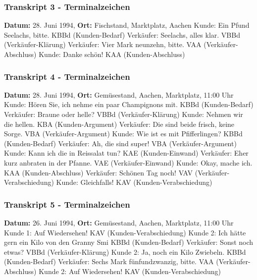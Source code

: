 \documentclass[
]{article}
\begin{document}
\subsubsection{\texorpdfstring{\textbf{Transkript 3 -
Terminalzeichen}}{Transkript 3 - Terminalzeichen}}\label{transkript-3---terminalzeichen-1}

\textbf{Datum:} 28. Juni 1994, \textbf{Ort:} Fischstand, Marktplatz,
Aachen\textbar{} Kunde: Ein Pfund Seelachs, bitte. \textbar{} KBBd
(Kunden-Bedarf) \textbar{} Verkäufer: Seelachs, alles klar. \textbar{}
VBBd (Verkäufer-Klärung) \textbar{} Verkäufer: Vier Mark neunzehn,
bitte. \textbar{} VAA (Verkäufer-Abschluss) \textbar{} Kunde: Danke
schön! \textbar{} KAA (Kunden-Abschluss)

\subsubsection{\texorpdfstring{\textbf{Transkript 4 -
Terminalzeichen}}{Transkript 4 - Terminalzeichen}}\label{transkript-4---terminalzeichen-1}

\textbf{Datum:} 28. Juni 1994, \textbf{Ort:} Gemüsestand, Aachen,
Marktplatz, 11:00 Uhr\textbar{} Kunde: Hören Sie, ich nehme ein paar
Champignons mit. \textbar{} KBBd (Kunden-Bedarf) \textbar{} Verkäufer:
Braune oder helle? \textbar{} VBBd (Verkäufer-Klärung) \textbar{} Kunde:
Nehmen wir die hellen. \textbar{} KBA (Kunden-Argument) \textbar{}
Verkäufer: Die sind beide frisch, keine Sorge. \textbar{} VBA
(Verkäufer-Argument) \textbar{} Kunde: Wie ist es mit Pfifferlingen?
\textbar{} KBBd (Kunden-Bedarf) \textbar{} Verkäufer: Ah, die sind
super! \textbar{} VBA (Verkäufer-Argument) \textbar{} Kunde: Kann ich
die in Reissalat tun? \textbar{} KAE (Kunden-Einwand) \textbar{}
Verkäufer: Eher kurz anbraten in der Pfanne. \textbar{} VAE
(Verkäufer-Einwand) \textbar{} Kunde: Okay, mache ich. \textbar{} KAA
(Kunden-Abschluss) \textbar{} Verkäufer: Schönen Tag noch! \textbar{}
VAV (Verkäufer-Verabschiedung) \textbar{} Kunde: Gleichfalls! \textbar{}
KAV (Kunden-Verabschiedung)

\subsubsection{\texorpdfstring{\textbf{Transkript 5 -
Terminalzeichen}}{Transkript 5 - Terminalzeichen}}\label{transkript-5---terminalzeichen-1}

\textbf{Datum:} 26. Juni 1994, \textbf{Ort:} Gemüsestand, Aachen,
Marktplatz, 11:00 Uhr\textbar{} Kunde 1: Auf Wiedersehen! \textbar{} KAV
(Kunden-Verabschiedung) \textbar{} Kunde 2: Ich hätte gern ein Kilo von
den Granny Smi\textbar{} KBBd (Kunden-Bedarf) \textbar{} Verkäufer:
Sonst noch etwas? \textbar{} VBBd (Verkäufer-Klärung) \textbar{} Kunde
2: Ja, noch ein Kilo Zwiebeln. \textbar{} KBBd (Kunden-Bedarf)
\textbar{} Verkäufer: Sechs Mark fünfundzwanzig, bitte. \textbar{} VAA
(Verkäufer-Abschluss) \textbar{} Kunde 2: Auf Wiedersehen! \textbar{}
KAV (Kunden-Verabschiedung)
\end{document}
